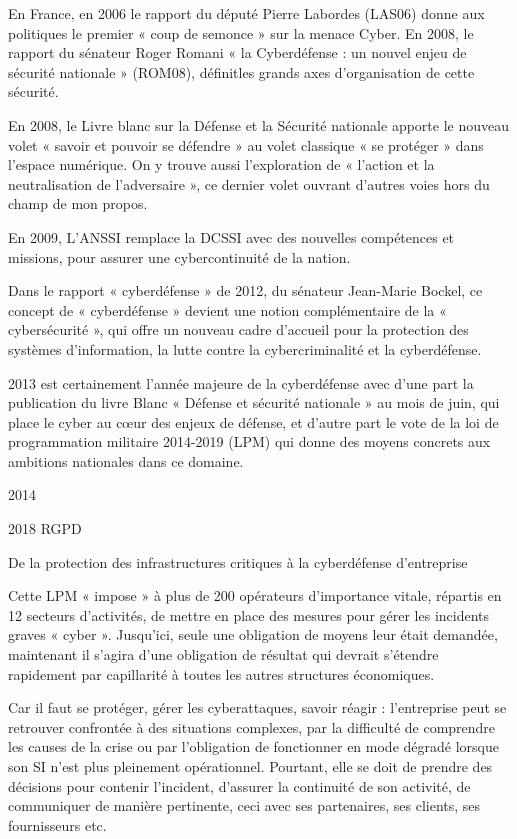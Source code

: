 En France, en 2006 le rapport du député Pierre Labordes (LAS06) donne aux politiques le premier « coup de semonce » sur la menace Cyber. En 2008, le rapport du sénateur Roger Romani « la Cyberdéfense : un nouvel enjeu de sécurité nationale » (ROM08), définitles grands axes d’organisation de cette sécurité.

En 2008, le Livre blanc sur la Défense et la Sécurité nationale apporte le nouveau volet « savoir et pouvoir se défendre » au volet classique « se protéger » dans l’espace numérique. On y trouve aussi l’exploration de « l’action et la neutralisation de l’adversaire », ce dernier volet ouvrant d’autres voies hors du champ de mon propos.

En 2009, L’ANSSI remplace la DCSSI avec des nouvelles compétences et missions, pour assurer une cybercontinuité de la nation.

Dans le rapport « cyberdéfense » de 2012, du sénateur Jean-Marie Bockel, ce concept de « cyberdéfense » devient une notion complémentaire de la « cybersécurité », qui offre un nouveau cadre d’accueil pour la protection des systèmes d’information, la lutte contre la cybercriminalité et la cyberdéfense.

2013 est certainement l’année majeure de la cyberdéfense avec d’une part la publication du livre Blanc « Défense et sécurité nationale » au mois de juin, qui place le cyber au cœur des enjeux de défense, et d’autre part le vote de la loi de programmation militaire 2014-2019 (LPM) qui donne des moyens concrets aux ambitions nationales dans ce domaine.

2014

2018 RGPD

De la protection des infrastructures critiques à la cyberdéfense d’entreprise

Cette LPM « impose » à plus de 200 opérateurs d’importance vitale, répartis en 12 secteurs d’activités, de mettre en place des mesures pour gérer les incidents graves « cyber ». Jusqu’ici, seule une obligation de moyens leur était demandée, maintenant il s’agira d’une obligation de résultat qui devrait s’étendre rapidement par capillarité à toutes les autres structures économiques.


Car il faut se protéger, gérer les cyberattaques, savoir réagir : l’entreprise peut se retrouver confrontée à des situations complexes, par la difficulté de comprendre les causes de la crise ou par l’obligation de fonctionner en mode dégradé lorsque son SI n’est plus pleinement opérationnel. Pourtant, elle se doit de prendre des décisions pour contenir l’incident, d’assurer la continuité de son activité, de communiquer de manière pertinente, ceci avec ses partenaires, ses clients, ses fournisseurs etc.                                                                                                                                                                                                

